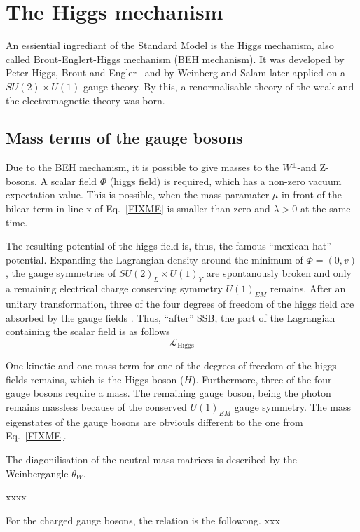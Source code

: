 \section{The Higgs mechanism}
An essiential ingrediant of the Standard Model is the Higgs mechanism, also called Brout-Englert-Higgs mechanism (BEH mechanism).
It was developed by Peter Higgs, Brout and Engler~\cite{FIXME} and by Weinberg and Salam later applied on a $SU(2) \times U(1)$ gauge theory.
By this, a renormalisable theory of the weak and the electromagnetic theory was born.

\subsection*{Mass terms of the gauge bosons}

Due to the BEH mechanism, it is possible to give masses to the $W^{\pm}$-and Z-bosons.
A scalar field $\Phi$ (higgs field) is required, which has a non-zero vacuum expectation value.
This is possible, when the mass paramater $\mu$ in front of the bilear term in line x of Eq.~\ref{FIXME} is smaller than zero and $\lambda>0$ at the same time.

The resulting potential of the higgs field is, thus, the famous ``mexican-hat'' potential.
Expanding the Lagrangian density around the minimum of $\Phi = \left( 0,v \right)$, the gauge symmetries of $SU(2)_L \times U(1)_Y$ are spontanously broken and only a remaining electrical charge conserving symmetry $U(1)_{EM}$ remains.
After an unitary transformation, three of the four degrees of freedom of the higgs field are absorbed by the gauge fields .
Thus, ``after'' SSB, the part of the Lagrangian containing the scalar field is as follows
\begin{equation}
\mathcal{L}_{\text{Higgs}}
\end{equation}

One kinetic and one mass term for one of the degrees of freedom of the higgs fields remains, which is the Higgs boson ($H$).
Furthermore, three of the four gauge bosons require a mass.
The remaining gauge boson, being the photon remains massless because of the conserved $U(1)_{EM}$ gauge symmetry.
The mass eigenstates of the gauge bosons are obviouls different to the one from Eq.~\eqref{FIXME}.

The diagonilisation of the neutral mass matrices is described by the Weinbergangle $\theta_W$.

xxxx

For the charged gauge bosons, the relation is the followong.
xxx

